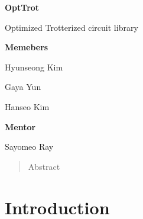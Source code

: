 \documentclass[a4paper,12pt]{article}
\newcommand{\courseName}{2024 IonQ summer Mentoring}
\newcommand{\assignmentTitle}{OptTrot}
\begin{document}
\begin{center}

    \vspace{0.5cm}
    {\Large\bfseries \assignmentTitle \par}
    {\large Optimized Trotterized circuit library \par}
    \vspace{1cm}
    {
    \noindent
    \begin{minipage}{0.45\textwidth}
        \centering
        \textbf{Memebers}

        Hyunseong Kim

        Gaya Yun

        Hanseo Kim
    \end{minipage}
    \begin{minipage}{0.45\textwidth}
        \centering
        \textbf{Mentor}

        Sayomeo Ray
    \end{minipage}
    }
    \begin{abstract}
    Abstract
    \end{abstract}
\end{center}



\section{Introduction}
\end{document}
